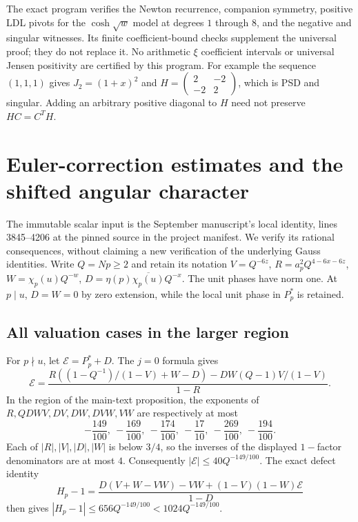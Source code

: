 The exact program  verifies the
Newton recurrence, companion symmetry, positive LDL pivots for the
$\cosh\sqrt w$ model at degrees $1$ through $8$, and the negative and
singular witnesses. Its finite coefficient-bound checks supplement the
universal proof; they do not replace it. No arithmetic $\xi$ coefficient
intervals or universal Jensen positivity are certified by this program.
For example the sequence $(1,1,1)$ gives $J_2=(1+x)^2$ and
$H=\left(\begin{smallmatrix}2&-2\\-2&2\end{smallmatrix}\right)$,
which is PSD and singular. Adding an arbitrary positive diagonal to $H$
need not preserve $HC=C^TH$.

\section{Euler-correction estimates and the shifted angular character}
The immutable scalar input is the September manuscript's local identity,
lines 3845--4206 at the pinned source in the project manifest. We verify
its rational consequences, without claiming a new verification of the
underlying Gauss identities. Write $Q=Np\ge2$ and retain its notation
$V=Q^{-6z}$, $R=a_p^2Q^{4-6x-6z}$, $W=\chi_p(u)Q^{-w}$,
$D=\eta(p)\overline{\chi_p(u)}Q^{-x}$.
The unit phases have norm one. At $p\mid u$, $D=W=0$ by zero
extension, while the local unit phase in $P_p^*$ is retained.

\subsection{All valuation cases in the larger region}
For $p\nmid u$, let $\mathcal E=P_p^*+D$. The $j=0$ formula gives
\[
 \mathcal E=\frac{R((1-Q^{-1})/(1-V)+W-D)
             -DW(Q-1)V/(1-V)}{1-R}.
\]
In the region of the main-text proposition, the exponents of
$R,QDWV,DV,DW,DVW,VW$ are respectively at most
\[
 -\frac{149}{100},\ -\frac{169}{100},\ -\frac{174}{100},\
 -\frac{17}{10},\ -\frac{269}{100},\ -\frac{194}{100}.
\]
Each of $|R|,|V|,|D|,|W|$ is below $3/4$, so the inverses of the
displayed $1-$factor denominators are at most $4$.
Consequently $|\mathcal E|\le40Q^{-149/100}$. The exact defect identity
\[
 H_p-1=\frac{D(V+W-VW)-VW+(1-V)(1-W)\mathcal E}{1-D}
\]
then gives $|H_p-1|\le656Q^{-149/100}<1024Q^{-149/100}$.

